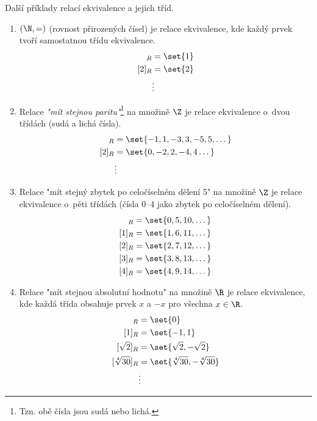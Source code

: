 \begin{example}
    Další příklady relací ekvivalence a jejich tříd.
    \begin{enumerate}[label=(\roman*)]
        \item $(\N,=)$ (rovnost přirozených čísel) je relace ekvivalence, kde každý prvek tvoří samostatnou třídu ekvivalence.
        \begin{align*}
            [1]_R&=\set{1}\\
            [2]_R&=\set{2}\\
            &\vdots
        \end{align*}
        \item Relace \emph{"mít stejnou paritu"}\footnote{Tzn. obě čísla jsou sudá nebo lichá.} na množině $\Z$ je relace ekvivalence o~dvou třídách (sudá a lichá čísla).
        \begin{align*}
            [1]_R&=\set{-1,1,-3,3,-5,5,\dots}\\
            [2]_R&=\set{0,-2,2,-4,4\dots}\\
            &\vdots
        \end{align*}
        \item Relace "mít stejný zbytek po celočíselném dělení 5" na množině $\Z$ je relace ekvivalence o~pěti třídách (čísla 0--4 jako zbytek po celočíselném dělení).
        \begin{align*}
            [0]_R&=\set{0,5,10,\dots}\\
            [1]_R&=\set{1,6,11,\dots}\\
            [2]_R&=\set{2,7,12,\dots}\\
            [3]_R&=\set{3,8,13,\dots}\\
            [4]_R&=\set{4,9,14,\dots}
        \end{align*}
        \item Relace "mít stejnou absolutní hodnotu" na množině $\R$ je relace ekvivalence, kde každá třída obsahuje prvek $x$ a $-x$ pro všechna $x\in\R$.
        \begin{align*}
            [0]_R&=\set{0}\\
            [1]_R&=\set{-1,1}\\
            [\sqrt{2}]_R&=\set{\sqrt{2},-\sqrt{2}}\\
            [\sqrt[4]{30}]_R&=\set{\sqrt[4]{30},-\sqrt[4]{30}}\\
            &\vdots
        \end{align*}
    \end{enumerate}
\end{example}

